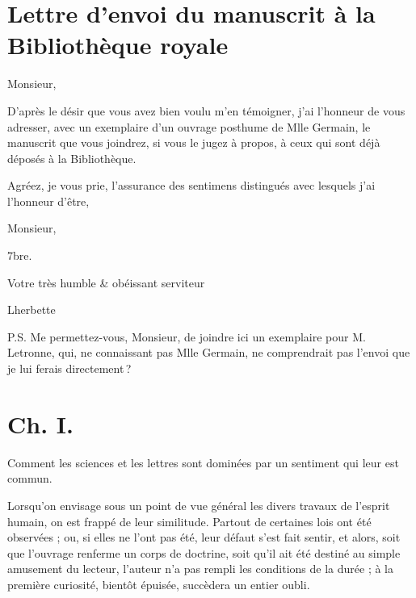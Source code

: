 \documentclass[11pt,a4paper]{article}
\begin{document}
\section{Lettre d'envoi du manuscrit à la Bibliothèque royale}


Monsieur,

D'après le désir que vous avez bien voulu m'en témoigner, j'ai l'honneur de
vous adresser, avec un exemplaire d'un ouvrage posthume de Mlle Germain, le
manuscrit que vous joindrez, si vous le jugez à propos, à ceux qui sont déjà
déposés à la Bibliothèque.

Agréez, je vous prie, l'assurance des sentimens distingués avec lesquels j'ai
l'honneur d'être,

Monsieur,

7bre.

Votre très humble \& obéissant serviteur

Lherbette


P.S. Me permettez-vous, Monsieur, de joindre ici un exemplaire pour
M. Letronne, qui, ne connaissant pas  Mlle Germain,
ne comprendrait pas l'envoi que je lui  ferais directement\,?

\section{Ch. I.}


Comment les sciences et les lettres sont dominées par un sentiment qui leur est
commun.


Lorsqu'on envisage sous un point de vue général les divers travaux de l'esprit
humain, on est frappé de leur similitude. Partout de certaines lois ont été
observées ; ou, si elles ne l'ont pas été, leur défaut s'est fait sentir, et
alors, soit que l'ouvrage renferme un corps de doctrine, soit qu'il ait été
destiné au simple amusement du lecteur, l'auteur n'a pas rempli les conditions
de la durée ; à la première curiosité, bientôt épuisée, succèdera un entier
oubli.
\end{document}
